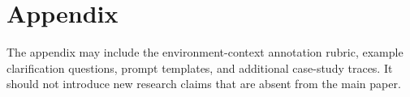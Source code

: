 \section{Appendix}
\label{appendix}

The appendix may include the environment-context annotation rubric, example clarification questions, prompt templates, and additional case-study traces.
It should not introduce new research claims that are absent from the main paper.

